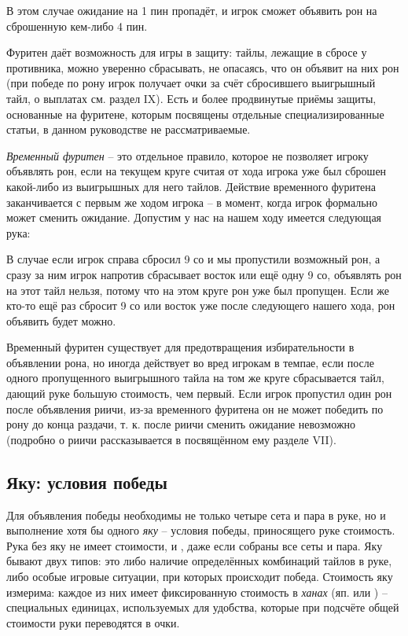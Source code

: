 В этом случае ожидание на 1 пин пропадёт, и игрок сможет объявить рон на сброшенную кем-либо 4 пин. 

Фуритен даёт возможность для игры в защиту: тайлы, лежащие в сбросе у противника, можно уверенно сбрасывать, не опасаясь, что он объявит на них рон (при победе по рону игрок получает очки за счёт сбросившего выигрышный тайл, о выплатах см. раздел IX). Есть и более продвинутые приёмы защиты, основанные на фуритене, которым посвящены отдельные специализированные статьи, в данном руководстве не рассматриваемые.

\textit{Временный фуритен} – это отдельное правило, которое не позволяет игроку объявлять рон, если на текущем круге считая от хода игрока уже был сброшен какой-либо из выигрышных для него тайлов. Действие временного фуритена заканчивается с первым же ходом игрока – в момент, когда игрок формально может сменить ожидание. Допустим у нас на нашем ходу имеется следующая рука:


В случае если игрок справа сбросил 9 со и мы пропустили возможный рон, а сразу за ним игрок напротив сбрасывает восток или ещё одну 9 со, объявлять рон на этот тайл нельзя, потому что на этом круге рон уже был пропущен. Если же кто-то ещё раз сбросит 9 со или восток уже после следующего нашего хода, рон объявить будет можно.

Временный фуритен существует для предотвращения избирательности в объявлении рона, но иногда действует во вред игрокам в темпае, если после одного пропущенного выигрышного тайла на том же круге сбрасывается тайл, дающий руке большую стоимость, чем первый. Если игрок пропустил один рон после объявления риичи, из-за временного фуритена он не может победить по рону до конца раздачи, т. к. после риичи сменить ожидание невозможно (подробно о риичи рассказывается в посвящённом ему разделе VII).

\subsection{Яку: условия победы}

Для объявления победы необходимы не только четыре сета и пара в руке, но и выполнение хотя бы одного \textit{яку} – условия победы, приносящего руке стоимость. Рука без яку не имеет стоимости, и , даже если собраны все сеты и пара. Яку бывают двух типов: это либо наличие определённых комбинаций тайлов в руке, либо особые игровые ситуации, при которых происходит победа. Стоимость яку измерима: каждое из них имеет фиксированную стоимость в \textit{ханах} (яп.  или ) – специальных единицах, используемых для удобства, которые при подсчёте общей стоимости руки переводятся в очки.

